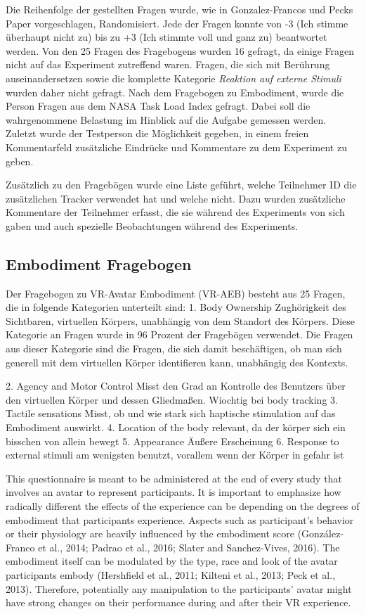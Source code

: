 Die Reihenfolge der gestellten Fragen wurde, wie in Gonzalez-Francos und Pecks Paper vorgeschlagen, Randomisiert. Jede der Fragen konnte von -3 (Ich stimme überhaupt nicht zu) bis zu +3 (Ich stimmte voll und ganz zu) beantwortet werden.
Von den 25 Fragen des Fragebogens wurden 16 gefragt, da einige Fragen nicht auf das Experiment zutreffend waren. Fragen, die sich mit Berührung auseinandersetzen sowie die komplette Kategorie \textit{Reaktion auf externe Stimuli} wurden daher nicht gefragt.
Nach dem Fragebogen zu Embodiment, wurde die Person Fragen aus dem NASA Task Load Index \cite{HART1988} gefragt. Dabei soll die wahrgenommene Belastung im Hinblick auf die Aufgabe gemessen werden.
Zuletzt wurde der Testperson die Möglichkeit gegeben, in einem freien Kommentarfeld zusätzliche Eindrücke und Kommentare zu dem Experiment zu geben.

Zusätzlich zu den Fragebögen wurde eine Liste geführt, welche Teilnehmer ID die zusätzlichen Tracker verwendet hat und welche nicht. Dazu wurden zusätzliche Kommentare der Teilnehmer erfasst, die sie während des Experiments von sich gaben und auch spezielle Beobachtungen während des Experiments.

\subsection{Embodiment Fragebogen}
Der Fragebogen zu VR-Avatar Embodiment (VR-AEB) besteht aus 25 Fragen, die in folgende Kategorien unterteilt sind:
1. Body Ownership
Zughörigkeit des Sichtbaren, virtuellen Körpers, unabhängig von dem Standort des Körpers. Diese Kategorie an Fragen wurde in 96 Prozent der Fragebögen verwendet. Die
Fragen aus dieser Kategorie sind die Fragen, die sich damit beschäftigen, ob man sich generell mit dem virtuellen Körper identifieren kann, unabhängig des Kontexts.


2. Agency and Motor Control
Misst den Grad an Kontrolle des Benutzers über den virtuellen Körper und dessen Gliedmaßen. Wiochtig bei body tracking
3. Tactile sensations
Misst, ob und wie stark sich haptische stimulation auf das Embodiment auswirkt.
4. Location of the body
relevant, da der körper sich ein bisschen von allein bewegt
5. Appearance
Äußere Erscheinung
6. Response to external stimuli
am wenigsten benutzt, vorallem wenn der Körper in gefahr ist

This questionnaire is meant to be administered at the end of
every study that involves an avatar to represent participants. It is important to emphasize how radically different the effects of the experience can be depending on the degrees of embodiment that participants experience. Aspects such as participant’s behavior or their physiology are heavily influenced by the embodiment score (González-Franco et al., 2014; Padrao et al., 2016; Slater and Sanchez-Vives, 2016). The embodiment itself can be modulated by the type, race and look of the avatar participants embody (Hershfield et al., 2011; Kilteni et al., 2013; Peck et al., 2013). Therefore, potentially any manipulation to the participants’ avatar might have strong changes on their performance during and after their VR experience.

